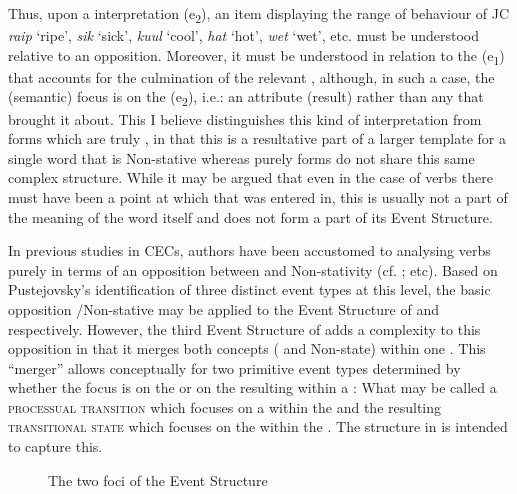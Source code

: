 Thus, upon a  interpretation (e\textsubscript{2}), an item displaying the range of behaviour of JC \textit{raip} `ripe’, \textit{sik} `sick’, \textit{kuul} `cool’, \textit{hat} `hot’, \textit{wet} `wet’, etc. must be understood relative to an opposition. Moreover, it must be understood in relation to the  (e\textsubscript{1}) that accounts for the culmination of the relevant , although, in such a case, the (semantic) focus is on the  (e\textsubscript{2}), i.e.: an attribute (result) rather than any  that brought it about. This I believe distinguishes this kind of  interpretation from forms which are truly , in that this  is a resultative part of a larger template for a single word that is Non-stative whereas purely  forms do not share this same complex structure. While it may be argued that even in the case of  verbs there must have been a point at which that  was entered in, this is usually not a part of the meaning of the word itself and does not form a part of its Event Structure.

In previous studies in CECs, authors have been accustomed to analysing verbs purely in terms of an opposition between  and Non-stativity (cf. \citealt{Bickerton1975,Jaganauth1987,Winford1993,Gooden2008}; etc). Based on Pustejovsky’s identification of three distinct event types at this level, the basic opposition \slash Non-stative may be applied to the Event Structure of  and  respectively. However, the third Event Structure of  adds a complexity to this opposition in that it merges both concepts ( and Non-state) within one . This ``merger'' allows conceptually for two primitive event types determined by whether the focus is on the  or on the resulting  within a : What may be called a \textsc{processual transition} which focuses on a  within the  and the resulting \textsc{transitional state} which focuses on the  within the . The structure in  is intended to capture this.

 \begin{figure}
 \caption{The two foci of the  Event Structure \label{ex:5:13}}
\end{figure}

